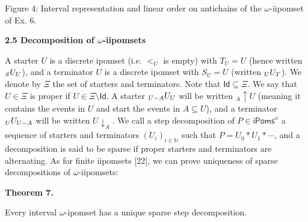 \begin{center}\end{center}
   
Figure 4: Interval representation and linear order on antichains of the $\omega$-iipomset of Ex. 6.\par
 
 
 
 
\par\medskip\noindent\textbf{2.5 Decomposition of $\omega$-iipomsets}\par
 
 
A starter $U$ is a discrete ipomset (i.e. $<_{U}$ is empty) with $T_{U}=U$ (hence written ${\vphantom{U}}_{S}U_{U}$), and a terminator $U$ is a discrete ipomset with $S_{U}=U$ (written ${\vphantom{U}}_{U}U_{T}$). We denote by $\Xi$ the set of starters and terminators. Note that $\mathsf{Id}\subseteq\Xi$. We say that $U\in\Xi$ is proper if $U\in\Xi\setminus\mathsf{Id}$. A starter ${\vphantom{U}}_{U-A}U_{U}$ will be written ${}_{A\!}{\uparrow}{U}$ (meaning it contains the events in $U$ and start the events in $A\subseteq U$), and a terminator ${\vphantom{U}}_{U}U_{U-A}$ will be written ${U}{\downarrow}_{A}$. We call a step decomposition of $P\in{\mathsf{iPoms}^{\omega}}$ a sequence of starters and terminators $(U_{i})_{i\in\mathbb{N}}$ such that $P=U_{0}*U_{1}*\cdots$, and a decomposition is said to be sparse if proper starters and terminators are alternating. As for finite iipomsets [22], we can prove uniqueness of sparse decompositions of $\omega$-iipomsets:\par
 
 
 
\par\medskip\noindent\textbf{Theorem 7.}\par
 
 
Every interval $\omega$-ipomset has a unique sparse step decomposition.\par
 
